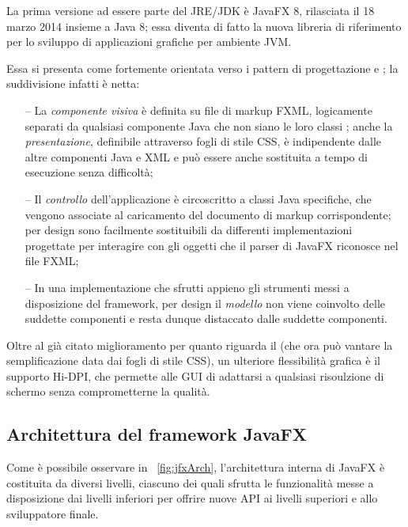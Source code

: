             La prima versione ad essere parte del JRE/JDK è JavaFX 8, rilasciata il 18 marzo 2014 insieme a Java 8; essa diventa di fatto la nuova libreria di riferimento per lo sviluppo di applicazioni grafiche per ambiente JVM.

            Essa si presenta come fortemente orientata verso i pattern di progettazione  e ; la suddivisione infatti è netta:
            \begin{itemize}
                \item[--] La \emph{componente visiva} è definita su file di markup FXML, logicamente separati da qualsiasi componente Java che non siano le loro classi ; anche la \emph{presentazione}, definibile attraverso fogli di stile CSS, è indipendente dalle altre componenti Java e XML e può essere anche sostituita a tempo di esecuzione senza difficoltà;
                \item[--] Il \emph{controllo} dell'applicazione è circoscritto a classi Java specifiche, che vengono associate al caricamento del documento di markup corrispondente; per design sono facilmente sostituibili da differenti implementazioni progettate per interagire con gli oggetti che il parser di JavaFX riconosce nel file FXML;
                \item[--] In una implementazione che sfrutti appieno gli strumenti messi a disposizione del framework, per design il \emph{modello} non viene coinvolto delle suddette componenti e resta dunque distaccato dalle suddette componenti.
            \end{itemize}

            Oltre al già citato miglioramento per quanto riguarda il  (che ora può vantare la semplificazione data dai fogli di stile CSS), un ulteriore flessibilità grafica è il supporto Hi-DPI, che permette alle GUI di adattarsi a qualsiasi risoulzione di schermo senza comprometterne la qualità.

        \subsection{Architettura del framework JavaFX}\label{sub:jfxFramework}
            Come è possibile osservare in \figurename~\vref{fig:jfxArch}, l'architettura interna di JavaFX è costituita da diversi livelli, ciascuno dei quali sfrutta le funzionalità messe a disposizione dai livelli inferiori per offrire nuove API ai livelli superiori e allo sviluppatore finale.

